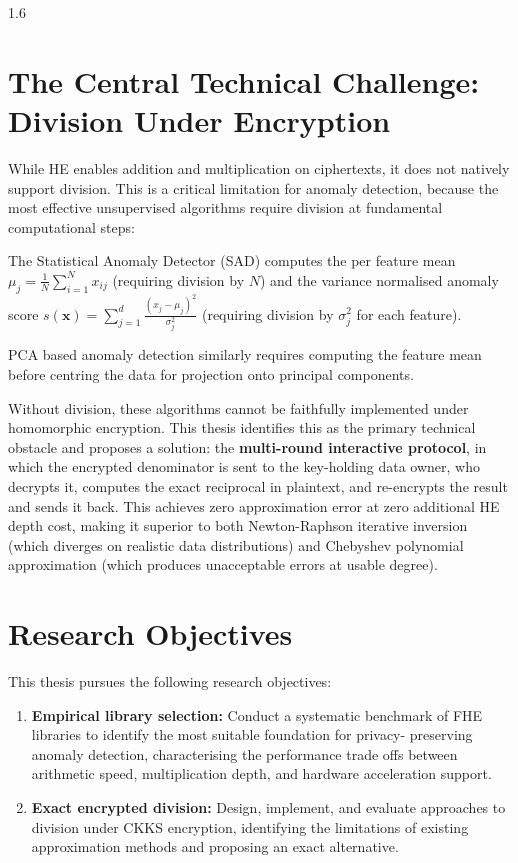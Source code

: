 \begin{spacing}{1.6}
\section{The Central Technical Challenge: Division Under Encryption}

While HE enables addition and multiplication on ciphertexts, it does not
natively support division. This is a critical limitation for anomaly detection,
because the most effective unsupervised algorithms require division at
fundamental computational steps:

The Statistical Anomaly Detector (SAD) computes the per feature mean
$\mu_j = \frac{1}{N}\sum_{i=1}^N x_{ij}$ (requiring division by $N$) and the
variance normalised anomaly score $s(\mathbf{x}) = \sum_{j=1}^d
\frac{(x_j - \mu_j)^2}{\sigma_j^2}$ (requiring division by $\sigma_j^2$
for each feature).

PCA based anomaly detection similarly requires computing the feature mean
before centring the data for projection onto principal components.

Without division, these algorithms cannot be faithfully implemented under
homomorphic encryption. This thesis identifies this as the primary technical
obstacle and proposes a solution: the \textbf{multi-round interactive
protocol}, in which the encrypted denominator is sent to the key-holding data
owner, who decrypts it, computes the exact reciprocal in plaintext, and
re-encrypts the result and sends it back. This achieves zero approximation error at zero
additional HE depth cost, making it superior to both Newton-Raphson iterative
inversion (which diverges on realistic data distributions) and Chebyshev
polynomial approximation (which produces unacceptable errors at usable degree).

\section{Research Objectives}

This thesis pursues the following research objectives:

\begin{enumerate}
  \item \textbf{Empirical library selection:} Conduct a systematic benchmark
  of FHE libraries to identify the most suitable foundation for privacy-
  preserving anomaly detection, characterising the performance trade offs between
  arithmetic speed, multiplication depth, and hardware acceleration support.

  \item \textbf{Exact encrypted division:} Design, implement, and evaluate
  approaches to division under CKKS encryption, identifying the limitations of
  existing approximation methods and proposing an exact alternative.


\end{enumerate}
\end{spacing}
